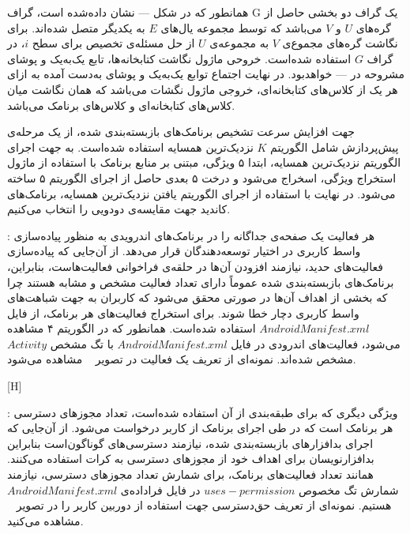 همانطور که در شکل --- نشان‌ داده‌شده است، گراف G یک گراف دو بخشی حاصل از گره‌های $U$ و $V$ می‌باشد که توسط مجموعه‌ یال‌های $E$ به یکدیگر متصل شده‌اند. برای نگاشت گره‌های مجموع‌ی  $V$ به مجموعه‌ی $U$ از حل مسئله‌ی تخصیص برای سطح $i$، در گراف $G$ استفاده شده‌است.  خروحی ماژول نگاشت کتابخانه‌ها، تابع یک‌به‌یک و پوشا‌ی مشروحه در --- خواهد‌بود. در نهایت اجتماع توابع یک‌به‌یک و پوشای به‌دست آمده به ازای هر یک از کلاس‌های کتابخانه‌ای، خروجی ماژول نگشات می‌باشد که همان نگاشت میان کلاس‌های کتابخانه‌ای و کلاس‌های برنامک می‌باشد.

جهت افزایش سرعت تشخیص برنامک‌های بازبسته‌بندی شده، از یک مرحله‌ی پیش‌پردازش شامل الگوریتم $K$ نزدیک‌ترین همسایه استفاده شده‌است. به جهت اجرای الگوریتم نزدیک‌ترین همسایه، ابتدا ۵ ویژگی، مبتنی بر منابع برنامک با استفاده از ماژول استخراج ویژگی‌، اسخراج می‌شود و درخت ۵ بعدی حاصل از اجرای الگوریتم ۵ ساخته می‌شود. در نهایت با استفاده از اجرای الگوریتم یافتن نزدیک‌ترین همسایه، برنامک‌های کاندید جهت مقایسه‌ی دودویی را انتخاب می‌کنیم.


: هر فعالیت یک صفحه‌ی جداگانه را در برنامک‌های اندرویدی به منظور پیاده‌سازی واسط‌ کاربری در اختیار توسعه‌دهندگان قرار می‌دهد. از آن‌جایی که پیاده‌سازی فعالیت‌های حدید، نیازمند افزودن آن‌ها در حلقه‌ی فراخوانی فعالیت‌هاست، بنابر‌این، برنامک‌های بازبسته‌بندی شده عموماً دارای تعداد فعالیت مشخص و مشابه هستند چرا که بخشی از اهداف آن‌ها در صورتی محقق می‌شود که کاربران به جهت شباهت‌های واسط کاربری دچار خطا شوند. برای استخراج فعالیت‌های هر برنامک، از فایل $AndroidManifest.xml$ استفاده شده‌است. همانطور که در الگوریتم ۴ مشاهده می‌شود، فعالیت‌های اندرودی در فایل $AndroidManifest.xml$ با تگ مشخص $Activity$ مشخص شده‌اند. نمونه‌ای از تعریف   یک فعالیت در تصویر ~ مشاهده می‌شود.

[H]
\vspace{1em}


: ویژگی دیگری که برای طبقه‌بندی از آن استفاده شده‌است، تعداد مجوز‌های دسترسی هر برنامک است که در طی اجرای برنامک از کاربر درخواست می‌شود. از آن‌جایی که اجرای بدافزار‌های بازبسته‌بندی شده، نیازمند دسترسی‌های گوناگون‌است بنابراین بدافزارنویسان برای اهداف خود از مجوز‌های دسترسی به کرات استفاده می‌کنند. همانند تعداد‌ فعالیت‌های برنامک، برای شمارش تعداد مجوز‌های دسترسی، نیازمند شمارش تگ مخصوص $uses-permission$ در فایل فراداده‌ی $AndroidManifest.xml$ هستیم. نمونه‌ای از تعریف حق‌دسترسی جهت استفاده از دوربین کاربر را در تصویر ~ مشاهده می‌کنید.


